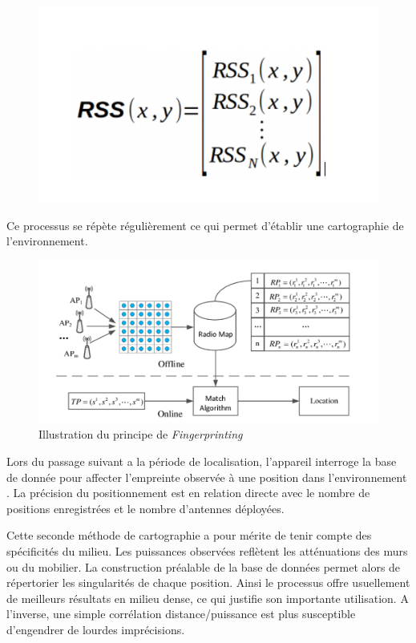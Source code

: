 \documentclass[12pt,a4paper]{report}
\begin{document}
\begin{itemize}
 \begin{figure}[H]
 	\centering
 	\includegraphics[width=0.5\linewidth]{Pics/sysRss.PNG}

 	
 	
 \end{figure}

Ce processus se répète régulièrement ce qui permet d’établir une  cartographie de l'environnement.
 \begin{figure}[H]
 	\centering
 	\includegraphics[width=1.1\linewidth]{Pics/sysRss2.PNG}
 	\caption{Illustration du principe de \textit{Fingerprinting}}
 	\label{fig:sysRss2}
 	
 	
 \end{figure}

Lors du passage suivant a la période de localisation, l’appareil interroge la base de donnée pour affecter l’empreinte observée à une position dans l’environnement . 
La précision du positionnement est en relation directe avec le nombre de positions enregistrées et le nombre d'antennes déployées.
\end{itemize}


Cette seconde méthode de cartographie a pour mérite de tenir compte des spécificités du milieu. Les puissances observées reflètent les atténuations des murs ou du mobilier. La construction préalable de la base de données permet alors de répertorier les singularités de chaque position.	Ainsi le processus offre usuellement de meilleurs résultats en milieu dense, ce qui justifie son importante utilisation. A l’inverse, une simple corrélation distance/puissance est plus susceptible d’engendrer de lourdes imprécisions.
\end{document}
